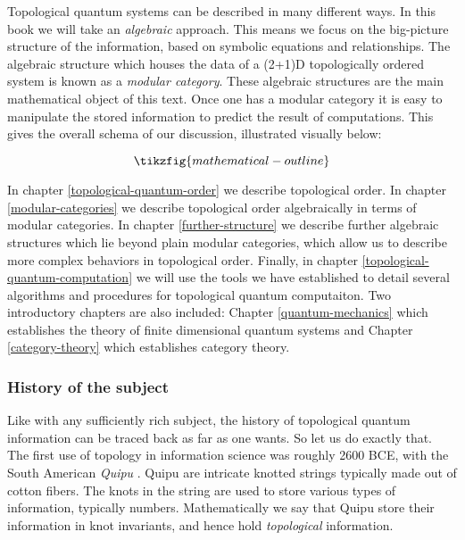 \begin{center}
\end{center}

Topological quantum systems can be described in many different ways. In this book we will take an {\em algebraic} approach. This means we focus on the big-picture structure of the information, based on symbolic equations and relationships. The algebraic structure which houses the data of a (2+1)D topologically ordered system is known as a {\em modular category}. These algebraic structures are the main mathematical object of this text. Once one has a modular category it is easy to manipulate the stored information to predict the result of computations. This gives the overall schema of our discussion, illustrated visually below:

\begin{equation*}
\tikzfig{mathematical-outline}
\end{equation*}

In chapter \ref{topological-quantum-order} we describe topological order. In chapter \ref{modular-categories} we describe topological order algebraically in terms of modular categories. In chapter \ref{further-structure} we describe further algebraic structures which lie beyond plain modular categories, which allow us to describe more complex behaviors in topological order. Finally, in chapter \ref{topological-quantum-computation} we will use the tools we have established to detail several algorithms and procedures for topological quantum computaiton. Two introductory chapters are also included: Chapter \ref{quantum-mechanics} which establishes the theory of finite dimensional quantum systems and Chapter \ref{category-theory} which establishes category theory.

\subsubsection{History of the subject}

Like with any sufficiently rich subject, the history of topological quantum information can be traced back as far as one wants. So let us do exactly that. The first use of topology in information science was roughly 2600 BCE, with the South American \textit{Quipu} \cite{ascher1981code}. Quipu are intricate knotted strings typically made out of cotton fibers. The knots in the string are used to store various types of information, typically numbers. Mathematically we say that Quipu store their information in knot invariants, and hence hold \textit{topological} information.

